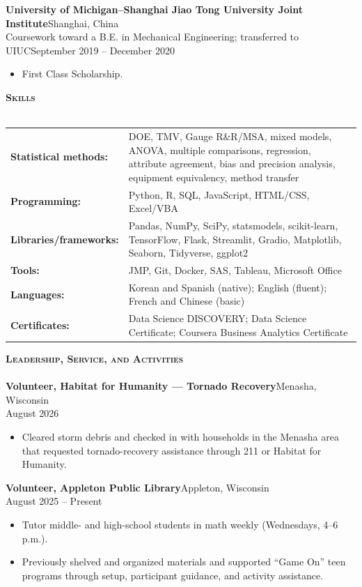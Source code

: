\documentclass[a4paper]{article}
\newcommand{\lineunder}{
    \vspace*{-8pt} \\
    \hspace*{-18pt} \hrulefill \\
}
\newcommand{\header}[1]{
    \Needspace{4\baselineskip}
    {\hspace*{-18pt}\vspace*{6pt} \textsc{#1}}
    \vspace*{-6pt} \lineunder
}
\begin{document}
\textbf{University of Michigan--Shanghai Jiao Tong University Joint Institute}\hfill Shanghai, China\\
Coursework toward a B.E. in Mechanical Engineering; transferred to UIUC\hfill September 2019 -- December 2020
\begin{itemize}[noitemsep]
  \item First Class Scholarship.
\end{itemize}

\vspace*{1mm}
\header{\textbf{Skills}}
\begin{tabular}{@{}l >{\raggedright\arraybackslash}p{}@{}}
\textbf{Statistical methods:} & DOE, TMV, Gauge R\&R/MSA, mixed models, ANOVA, multiple comparisons, regression, attribute agreement, bias and precision analysis, equipment equivalency, method transfer\\
\textbf{Programming:} & Python, R, SQL, JavaScript, HTML/CSS, Excel/VBA\\
\textbf{Libraries/frameworks:} & Pandas, NumPy, SciPy, statsmodels, scikit-learn, TensorFlow, Flask, Streamlit, Gradio, Matplotlib, Seaborn, Tidyverse, ggplot2\\
\textbf{Tools:} & JMP, Git, Docker, SAS, Tableau, Microsoft Office\\
\textbf{Languages:} & Korean and Spanish (native); English (fluent); French and Chinese (basic)\\
\textbf{Certificates:} & Data Science DISCOVERY; Data Science Certificate; Coursera Business Analytics Certificate
\end{tabular}

\vspace*{1mm}
\header{\textbf{Leadership, Service, and Activities}}

\textbf{Volunteer, Habitat for Humanity --- Tornado Recovery}\hfill Menasha, Wisconsin\\
August 2026
\begin{itemize}[noitemsep]
  \item Cleared storm debris and checked in with households in the Menasha area that requested tornado-recovery assistance through 211 or Habitat for Humanity.
\end{itemize}

\textbf{Volunteer, Appleton Public Library}\hfill Appleton, Wisconsin\\
August 2025 -- Present
\begin{itemize}[noitemsep]
  \item Tutor middle- and high-school students in math weekly (Wednesdays, 4--6 p.m.).
  \item Previously shelved and organized materials and supported ``Game On'' teen programs through setup, participant guidance, and activity assistance.
\end{itemize}
\end{document}
